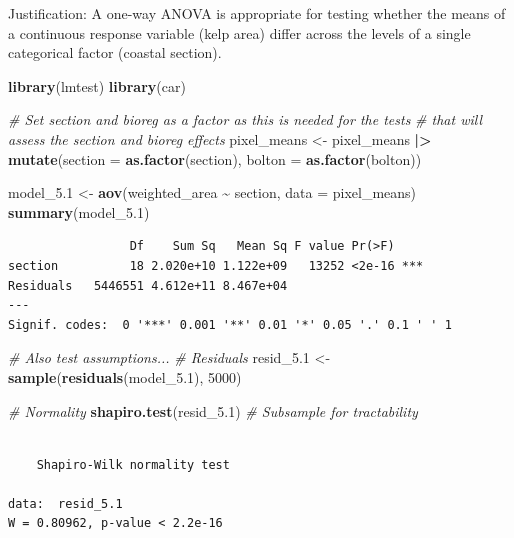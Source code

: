 \documentclass[
  british,
  10pt,
]{article}
\newenvironment{Shaded}{\begin{snugshade}}{\end{snugshade}}
\newcommand{\AttributeTok}[1]{\textcolor[rgb]{0.13,0.29,0.53}{#1}}
\newcommand{\CommentTok}[1]{\textcolor[rgb]{0.56,0.35,0.01}{\textit{#1}}}
\newcommand{\DecValTok}[1]{\textcolor[rgb]{0.00,0.00,0.81}{#1}}
\newcommand{\FloatTok}[1]{\textcolor[rgb]{0.00,0.00,0.81}{#1}}
\newcommand{\FunctionTok}[1]{\textcolor[rgb]{0.13,0.29,0.53}{\textbf{#1}}}
\newcommand{\NormalTok}[1]{#1}
\newcommand{\OtherTok}[1]{\textcolor[rgb]{0.56,0.35,0.01}{#1}}
\newcommand{\SpecialCharTok}[1]{\textcolor[rgb]{0.81,0.36,0.00}{\textbf{#1}}}
\begin{document}
Justification: A one-way ANOVA is appropriate for testing whether the
means of a continuous response variable (kelp area) differ across the
levels of a single categorical factor (coastal section).

\begin{Shaded}
\begin{Highlighting}[]
\FunctionTok{library}\NormalTok{(lmtest)}
\FunctionTok{library}\NormalTok{(car)}

\CommentTok{\# Set section and bioreg as a factor as this is needed for the tests}
\CommentTok{\# that will assess the section and bioreg effects}
\NormalTok{pixel\_means }\OtherTok{\textless{}{-}}\NormalTok{ pixel\_means }\SpecialCharTok{|\textgreater{}} 
  \FunctionTok{mutate}\NormalTok{(}\AttributeTok{section =} \FunctionTok{as.factor}\NormalTok{(section),}
         \AttributeTok{bolton =} \FunctionTok{as.factor}\NormalTok{(bolton))}

\NormalTok{model\_5}\FloatTok{.1} \OtherTok{\textless{}{-}} \FunctionTok{aov}\NormalTok{(weighted\_area }\SpecialCharTok{\textasciitilde{}}\NormalTok{ section, }\AttributeTok{data =}\NormalTok{ pixel\_means)}
\FunctionTok{summary}\NormalTok{(model\_5}\FloatTok{.1}\NormalTok{)}
\end{Highlighting}
\end{Shaded}

\begin{verbatim}
                 Df    Sum Sq   Mean Sq F value Pr(>F)    
section          18 2.020e+10 1.122e+09   13252 <2e-16 ***
Residuals   5446551 4.612e+11 8.467e+04                   
---
Signif. codes:  0 '***' 0.001 '**' 0.01 '*' 0.05 '.' 0.1 ' ' 1
\end{verbatim}

\begin{Shaded}
\begin{Highlighting}[]
\CommentTok{\# Also test assumptions...}
\CommentTok{\# Residuals}
\NormalTok{resid\_5}\FloatTok{.1} \OtherTok{\textless{}{-}} \FunctionTok{sample}\NormalTok{(}\FunctionTok{residuals}\NormalTok{(model\_5}\FloatTok{.1}\NormalTok{), }\DecValTok{5000}\NormalTok{)}

\CommentTok{\# Normality}
\FunctionTok{shapiro.test}\NormalTok{(resid\_5}\FloatTok{.1}\NormalTok{)  }\CommentTok{\# Subsample for tractability}
\end{Highlighting}
\end{Shaded}

\begin{verbatim}

    Shapiro-Wilk normality test

data:  resid_5.1
W = 0.80962, p-value < 2.2e-16
\end{verbatim}
\end{document}
